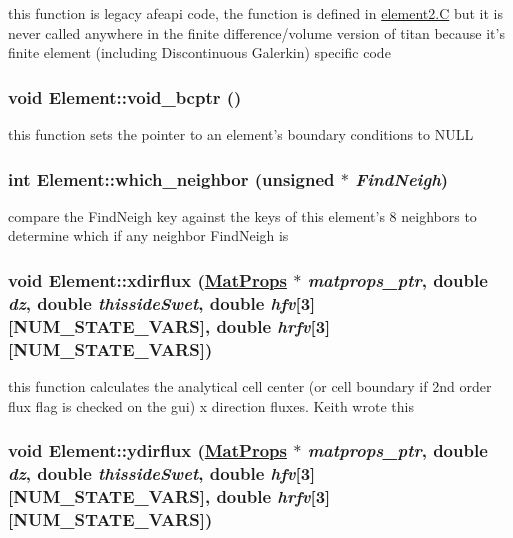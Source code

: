 this function is legacy afeapi code, the function is defined in \hyperlink{constant_8h_a21}{element2.C} but it is never called anywhere in the finite difference/volume version of titan because it's finite element (including Discontinuous Galerkin) specific code 

\hypertarget{classElement_a53}{
\subsubsection[void\_\-bcptr]{\setlength{\rightskip}{0pt plus 5cm}void Element::void\_\-bcptr ()}}
\label{classElement_a53}


this function sets the pointer to an element's boundary conditions to NULL 

\hypertarget{classElement_a32}{
\subsubsection[which\_\-neighbor]{\setlength{\rightskip}{0pt plus 5cm}int Element::which\_\-neighbor (unsigned $\ast$ {\em Find\-Neigh})}}
\label{classElement_a32}


compare the Find\-Neigh key against the keys of this element's 8 neighbors to determine which if any neighbor Find\-Neigh is 

\hypertarget{classElement_a76}{
\subsubsection[xdirflux]{\setlength{\rightskip}{0pt plus 5cm}void Element::xdirflux (\hyperlink{structMatProps}{Mat\-Props} $\ast$ {\em matprops\_\-ptr}, double {\em dz}, double {\em thisside\-Swet}, double {\em hfv}\mbox{[}3\mbox{]}\mbox{[}NUM\_\-STATE\_\-VARS\mbox{]}, double {\em hrfv}\mbox{[}3\mbox{]}\mbox{[}NUM\_\-STATE\_\-VARS\mbox{]})}}
\label{classElement_a76}


this function calculates the analytical cell center (or cell boundary if 2nd order flux flag is checked on the gui) x direction fluxes. Keith wrote this 

\hypertarget{classElement_a77}{
\subsubsection[ydirflux]{\setlength{\rightskip}{0pt plus 5cm}void Element::ydirflux (\hyperlink{structMatProps}{Mat\-Props} $\ast$ {\em matprops\_\-ptr}, double {\em dz}, double {\em thisside\-Swet}, double {\em hfv}\mbox{[}3\mbox{]}\mbox{[}NUM\_\-STATE\_\-VARS\mbox{]}, double {\em hrfv}\mbox{[}3\mbox{]}\mbox{[}NUM\_\-STATE\_\-VARS\mbox{]})}}
\label{classElement_a77}



